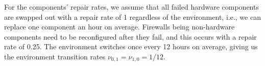 \documentclass[12pt]{article}
\begin{document}
For the components' repair rates, we assume that all failed hardware
components are swapped out with a repair rate of 1 regardless of the
environment, i.e., we can replace one component an hour on average. Firewalls
being non-hardware components need to be reconfigured after they fail, and this
occurs with a repair rate of 0.25. The environment switches
once every 12 hours on average, giving us the environment transition
rates $\nu_{0, 1} = \nu_{1, 0} = 1 / 12$.



\end{document}
